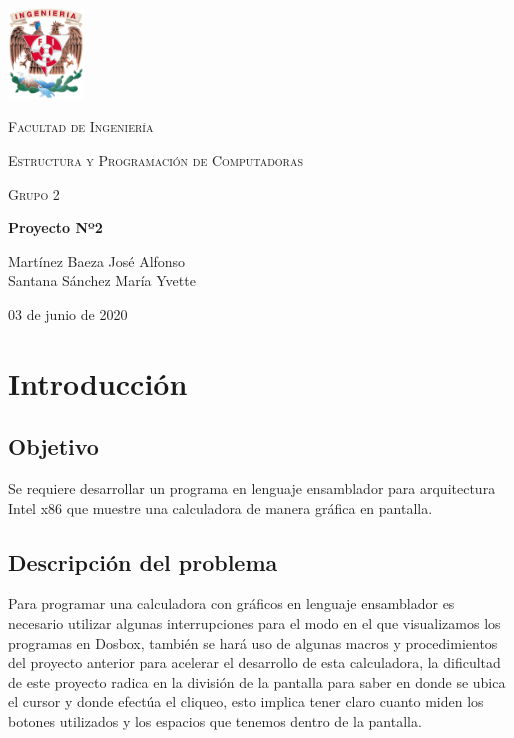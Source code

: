\documentclass[letterpaper,12 pt,titlepage]{article}
\begin{document}
    \begin{titlepage}
        \centering
        \includegraphics[width=0.15\textwidth]{img/escudo_fi_color.png}\par\vspace{1cm}
        {\scshape\LARGE Facultad de Ingeniería \par}
        \vspace{1cm}
        {\scshape\Large Estructura y Programación de Computadoras
        \par}
        \vspace{1cm}
        {\scshape\Large Grupo 2
        \par}
        \vspace{1.5cm}
        {\huge\bfseries Proyecto Nº2\par}
        \vspace{2cm}
        {\Large 
            Martínez Baeza José Alfonso\\
            Santana Sánchez María Yvette
        \par}
        \vfill
        {\large 03 de junio de 2020\par}
    \end{titlepage}

    \tableofcontents
    \newpage

    \section{Introducción}

    \subsection{Objetivo}
        Se requiere desarrollar un programa en lenguaje ensamblador para arquitectura Intel x86 que muestre una calculadora de manera gráfica en pantalla.

    \subsection{Descripción del problema}
        Para programar una calculadora con gráficos en lenguaje ensamblador es necesario utilizar algunas interrupciones para el modo en el que visualizamos los programas en Dosbox, también se hará uso de algunas macros y procedimientos del proyecto anterior para acelerar el desarrollo de esta calculadora, la dificultad de este proyecto radica en la división de la pantalla para saber en donde se ubica el cursor y donde efectúa el cliqueo, esto implica tener claro cuanto miden los botones utilizados y los espacios que tenemos dentro de la pantalla. 
\end{document}
